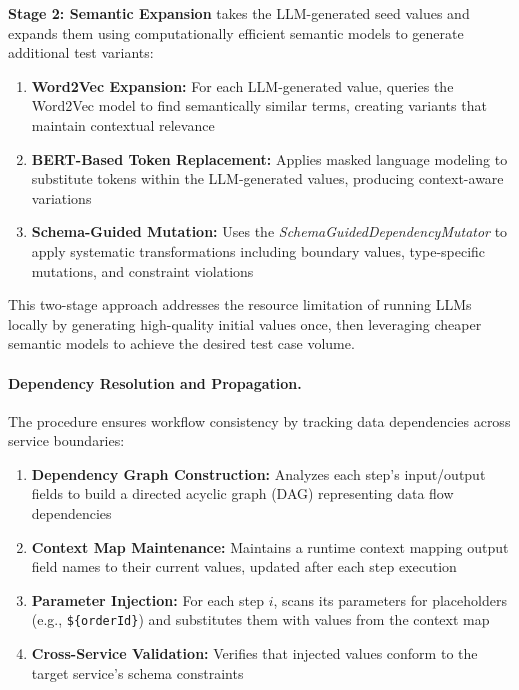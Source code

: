 \documentclass[conference]{IEEEtran}
\begin{document}
\textbf{Stage 2: Semantic Expansion} takes the LLM-generated seed values
and expands them using computationally efficient semantic models to
generate additional test variants:

\begin{enumerate}[leftmargin=*]
  \item \textbf{Word2Vec Expansion:} For each LLM-generated value,
        queries the Word2Vec model to find semantically similar terms,
        creating variants that maintain contextual relevance
  \item \textbf{BERT-Based Token Replacement:} Applies masked language
        modeling to substitute tokens within the LLM-generated values,
        producing context-aware variations
  \item \textbf{Schema-Guided Mutation:} Uses the
        \emph{SchemaGuidedDependencyMutator} to apply systematic
        transformations including boundary values, type-specific
        mutations, and constraint violations
\end{enumerate}

This two-stage approach addresses the resource limitation of running LLMs
locally by generating high-quality initial values once, then leveraging
cheaper semantic models to achieve the desired test case volume.

\paragraph{Dependency Resolution and Propagation.}
The  procedure ensures workflow consistency by
tracking data dependencies across service boundaries:

\begin{enumerate}[leftmargin=*]
  \item \textbf{Dependency Graph Construction:} Analyzes each step's
        input/output fields to build a directed acyclic graph (DAG)
        representing data flow dependencies
  \item \textbf{Context Map Maintenance:} Maintains a runtime context
        mapping output field names to their current values, updated
        after each step execution
  \item \textbf{Parameter Injection:} For each step $i$, scans its
        parameters for placeholders (e.g., \texttt{\$\{orderId\}}) and
        substitutes them with values from the context map
  \item \textbf{Cross-Service Validation:} Verifies that injected
        values conform to the target service's schema constraints
\end{enumerate}
\end{document}
